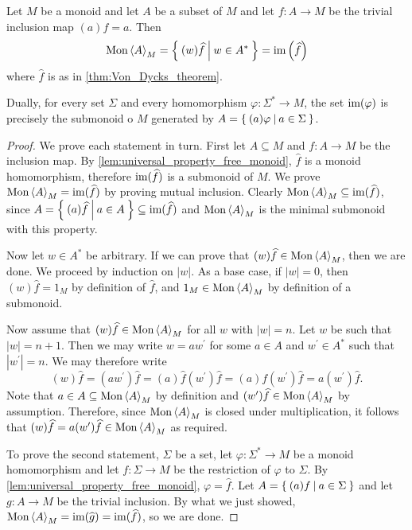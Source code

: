 \begin{lemma}\label{lem:submonoid_characterization_free_monoid_image}
  \rocqok{}
  Let $M$ be a monoid and let $A$ be a subset of $M$ and let $f: A\rightarrow M$ be the trivial
  inclusion map $(a)f = a$. Then
  \[\textrm{Mon}\left\langle A \right\rangle_M = \left\{\: (w)\widehat{f} \: \middle|\: w\in A^\ast \:\right\} = \textrm{im}\left(\widehat{f}\right)\]
  where $\widehat{f}$ is as in \cref{thm:Von_Dycks_theorem}.

  Dually, for every set $\Sigma$ and every homomorphism $\varphi: \Sigma^\ast\rightarrow M$, the
  set $\textrm{im}(\varphi)$ is precisely the submonoid o $M$ generated by $A = \left\{\: (a)\varphi \: \middle|\: a\in \Sigma \:\right\}$.
\end{lemma}
\begin{proof}
  \rocqok{}
  We prove each statement in turn. First let $A\subseteq M$ and $f: A\rightarrow M$ be the
  inclusion map. By \cref{lem:universal_property_free_monoid}, $\widehat{f}$ is a monoid
  homomorphism, therefore $\textrm{im}(\widehat{f})$ is a submonoid of $M$.
  We prove $\textrm{Mon}\left\langle A \right\rangle_M = \textrm{im}(\widehat{f})$ by proving mutual inclusion. Clearly
  $\textrm{Mon}\left\langle A \right\rangle_M \subseteq \textrm{im}(\widehat{f})$, since
  $A = \left\{\: (a)\widehat{f} \: \middle|\: a\in A \:\right\}\subseteq \textrm{im}(\widehat{f})$ and $\textrm{Mon}\left\langle A \right\rangle_M$
  is the minimal submonoid with this property.

  Now let $w\in A^\ast$ be arbitrary. If we can prove that $(w)\widehat{f}\in \textrm{Mon}\left\langle A \right\rangle_M$, then we are done.
  We proceed by induction on $|w|$.
  As a base case, if $|w| = 0$, then $(w)\widehat{f} = 1_M$ by definition of $\widehat{f}$, and
  $1_M\in \textrm{Mon}\left\langle A \right\rangle_M$ by definition of a submonoid.

  Now assume that $(w)\widehat{f} \in \textrm{Mon}\left\langle A \right\rangle_M$ for all $w$ with
  $|w| = n$. Let $w$ be such that $|w| = n+1$. Then we may write $w = aw^\prime$ for some $a\in
  A$ and $w^\prime \in A^\ast$ such that $|w^\prime| = n$. We may therefore write
  \[
    (w)\widehat{f} = (aw^\prime)\widehat{f} = (a)\widehat{f} (w^\prime)\widehat{f} =
    (a)f (w^\prime) \widehat{f} = a (w^\prime) \widehat{f}.
  \]
  Note that $a\in A \subseteq \textrm{Mon}\left\langle A \right\rangle_M$ by definition and
  $(w^\prime)\widehat{f} \in\textrm{Mon}\left\langle A \right\rangle_M$ by assumption. Therefore, since $\textrm{Mon}\left\langle A \right\rangle_M$
  is closed under multiplication, it follows that
  $(w)\widehat{f} = a (w^\prime)\widehat{f} \in \textrm{Mon}\left\langle A \right\rangle_M$ as required.

  To prove the second statement, $\Sigma$ be a set, let $\varphi: \Sigma^\ast \rightarrow M$ be a
  monoid homomorphism and let $f: \Sigma \rightarrow M$ be the restriction of $\varphi$ to
  $\Sigma$. By \cref{lem:universal_property_free_monoid}, $\varphi = \widehat{f}$. Let
  $A = \left\{\: (a)f \: \middle|\:  a\in \Sigma \:\right\}$ and let
  $g: A\rightarrow M$ be the trivial inclusion. By what we just showed,
  $\textrm{Mon}\left\langle A \right\rangle_M = \textrm{im}(\widehat{g}) = \textrm{im}(\widehat{f})$, so we are done.
\end{proof}

